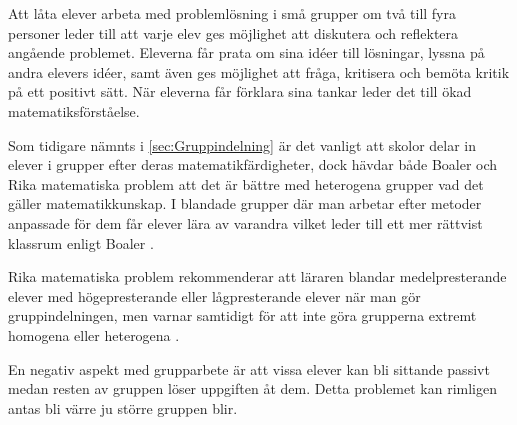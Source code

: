 \textcolor{turkos} {
Att låta elever arbeta med problemlösning i små grupper om två till fyra personer leder till att varje elev ges möjlighet att diskutera och reflektera angående problemet. Eleverna får prata om sina idéer till lösningar, lyssna på andra elevers idéer, samt även ges möjlighet att fråga, kritisera och bemöta kritik på ett positivt sätt. När eleverna får förklara sina tankar leder det till ökad matematiksförståelse. \cite{RikaProblem}
}

\textcolor{turkos} {
Som tidigare nämnts i \ref{sec:Gruppindelning} är det vanligt att skolor delar in elever i grupper efter deras matematikfärdigheter, dock hävdar både Boaler \cite{TheElephant} och Rika matematiska problem \cite{RikaProblem} att det är bättre med heterogena grupper vad det gäller matematikkunskap. I blandade grupper där man arbetar efter metoder anpassade för dem får elever lära av varandra vilket leder till ett mer rättvist klassrum enligt Boaler \cite{TheElephant}. 
}

\textcolor{turkos} {
Rika matematiska problem rekommenderar att läraren blandar medelpresterande elever med högepresterande eller lågpresterande elever när man gör gruppindelningen, men varnar samtidigt för att inte göra grupperna extremt homogena eller heterogena \cite{RikaProblem}.
}




\textcolor{turkos} {
En negativ aspekt med grupparbete är att vissa elever kan bli sittande passivt medan resten av gruppen löser uppgiften åt dem\cite{RikaProblem}. Detta problemet kan rimligen antas bli värre ju större gruppen blir. 
}











